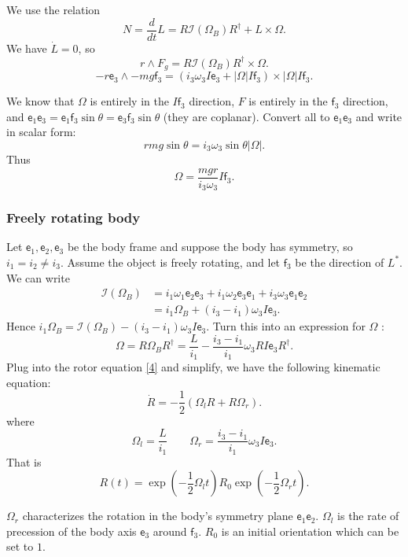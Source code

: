 We use the relation
\[
	N = \frac{d}{dt }L = R\mathcal{I}(\Omega_B) R^\dag + L \times \Omega
.\] 
We have $\dot L = 0$, so
 \[
	r \wedge F_g = R \mathcal{I}(\Omega_B)R^\dag \times \Omega
.\] 
\[
	-r \mathsf{e}_3 \wedge -mg \mathsf{f}_3 = \left( i_3 \omega_3 I \mathsf{e}_3 + |\Omega| I \mathsf{f}_3 \right) \times |\Omega| I \mathsf{f}_3
.\] 


We know that $\Omega$ is entirely in the $I \mathsf{f}_3$ direction, $F$ is entirely in the $\mathsf{f}_3$ direction, and $\mathsf{e}_1 \mathsf{e}_3 = \mathsf{e}_1 \mathsf{f}_3 \sin \theta = \mathsf{e}_3 \mathsf{f}_3 \sin \theta$ (they are coplanar). 
Convert all to $\mathsf{e}_1 \mathsf{e}_3$ and
write in scalar form:
\[
	r m g \sin \theta = i_3 \omega_3 \sin \theta | \Omega |
.\] 
Thus
\[
	\Omega = \frac{m g r}{i_3 \omega_3} I \mathsf{f}_3
.\] 

\subsubsection{Freely rotating body}


Let $\mathsf{e}_1, \mathsf{e}_2, \mathsf{e}_3$ be the body frame and suppose the body has symmetry, so $i_1 = i_2 \neq i_3$. Assume the object is freely rotating, and let $\mathsf{f}_3$ be the direction of $L^*$. We can write
\begin{align}
	\mathcal{I}(\Omega_B)
	\nonumber
	&= i_1 \omega_1 \mathsf{e}_2\mathsf{e}_3 + i_1\omega_2 \mathsf{e}_3 \mathsf{e}_1 + i_3 \omega_3 \mathsf{e}_1 \mathsf{e}_2 \\
	\label{1}
	&= i_1 \Omega_B + (i_3 - i_1) \omega_3 I \mathsf{e}_3
.\end{align} 
Hence $i_1 \Omega_B = \mathcal{I}(\Omega_B) - (i_3 - i_1) \omega_3 I \mathsf{e}_3$. Turn this into an expression for $\Omega$ :
\[
	\Omega = R \Omega_B R^\dag = \frac{L}{i_1} - \frac{i_3 - i_1}{i_1} \omega_3 R I \mathsf{e}_3 R^\dag
.\] 
Plug into the rotor equation \eqref{4} and simplify, we have
the following kinematic equation:
\[
	\dot R = -\frac{1}{2} (\Omega_l R + R \Omega_r)
.\] 
where
\[
	\Omega_l = \frac{L}{i_1} \qquad \Omega_r = \frac{i_3 - i_1}{i_1}\omega_3 I \mathsf{e}_3
.\] 
That is
\[
	R(t) = \exp\left( -\frac{1}{2} \Omega_l t \right) R_0 
	\exp\left( -\frac{1}{2} \Omega_r t \right) 
.\] 

\begin{intuition}
	$\Omega_r$ characterizes the rotation in the body's symmetry plane $\mathsf{e}_1 \mathsf{e}_2$. $\Omega_l$ is the rate of precession of the body axis $\mathsf{e}_3$ around $\mathsf{f}_3$. $R_0$ is an initial orientation which can be set to $1$.
\end{intuition}

